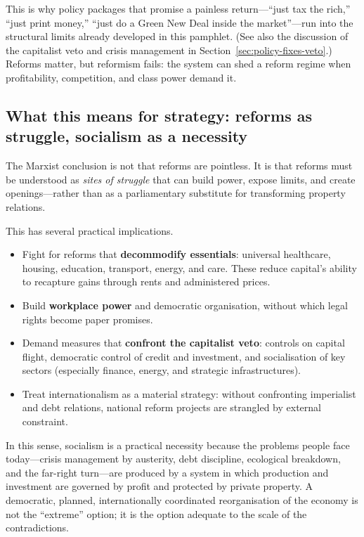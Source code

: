 This is why policy packages that promise a painless return—``just tax the rich,'' ``just print money,'' ``just do a Green
New Deal inside the market''—run into the structural limits already developed in this pamphlet. (See also the discussion
of the capitalist veto and crisis management in Section~\ref{sec:policy-fixes-veto}.) Reforms matter, but
reformism fails: the system can shed a reform regime when profitability, competition, and class power demand it.

\subsection{What this means for strategy: reforms as struggle, socialism as a necessity}
\label{subsec:strategy-reforms-socialism}

The Marxist conclusion is not that reforms are pointless. It is that reforms must be understood as \emph{sites of struggle}
that can build power, expose limits, and create openings—rather than as a parliamentary substitute for transforming property
relations.

This has several practical implications.

\begin{itemize}[leftmargin=1.5em]
  \item Fight for reforms that \textbf{decommodify essentials}: universal healthcare, housing, education, transport, energy,
  and care. These reduce capital's ability to recapture gains through rents and administered prices.

  \item Build \textbf{workplace power} and democratic organisation, without which legal rights become paper promises.

  \item Demand measures that \textbf{confront the capitalist veto}: controls on capital flight, democratic control of credit
  and investment, and socialisation of key sectors (especially finance, energy, and strategic infrastructures).

  \item Treat internationalism as a material strategy: without confronting imperialist and debt relations, national reform
projects are strangled by external constraint.
\end{itemize}

In this sense, socialism is a practical necessity because
the problems people face today—crisis management by austerity, debt discipline, ecological breakdown, and the far-right
turn—are produced by a system in which production and investment are governed by profit and protected by private property.
A democratic, planned, internationally coordinated reorganisation of the economy is not the ``extreme'' option; it is the
option adequate to the scale of the contradictions.

